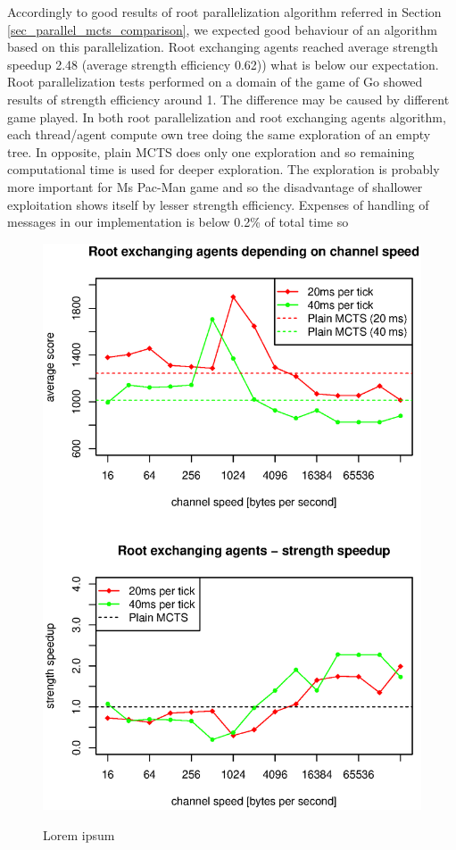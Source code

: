 Accordingly to good results of root parallelization algorithm referred in Section
\ref{sec_parallel_mcts_comparison}, we expected good behaviour of an algorithm based on this
parallelization. Root exchanging agents reached average strength speedup 2.48 (average strength
efficiency 0.62)) 
what is below our
expectation. Root parallelization tests performed on a domain of the game of Go
\cite{Chaslot2008} showed results of strength efficiency around 1. The difference may be caused
by different game played. In both root parallelization and root exchanging agents algorithm,
each thread/agent compute own tree doing the same exploration of an empty tree. In opposite,
plain MCTS does only one exploration and so remaining computational time is used for deeper
exploration. The exploration is probably more important for Ms Pac-Man game and so the
disadvantage of shallower exploitation shows itself by lesser strength efficiency. Expenses of
handling of messages in our implementation is below 0.2\% of total time so \todo{!}



\begin{figure}
\begin{center}
\includegraphics{img/root-exchange-channel-speed.eps}
\end{center}
\caption{\footnotesize Lorem ipsum}{\footnotesize }
\label{fig_root_exchanging_channel_speed}
\end{figure}





